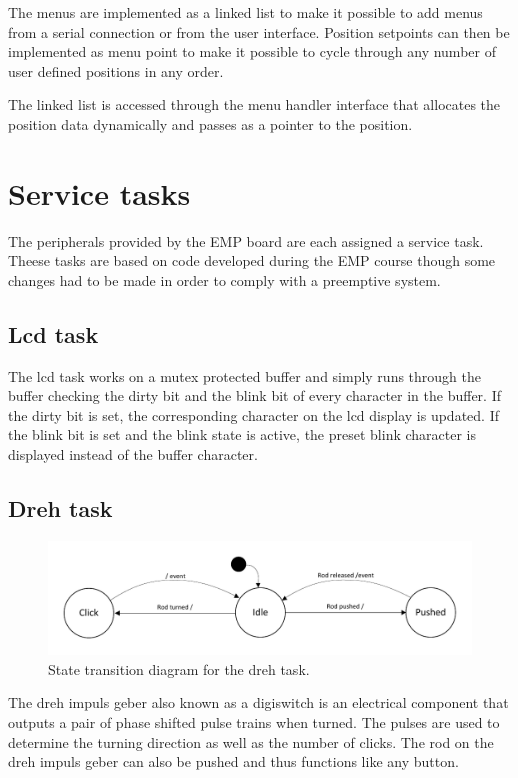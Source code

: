 The menus are implemented as a linked list to make it possible to add menus from a serial connection or from the user interface. Position setpoints can then be implemented as menu point to make it possible to cycle through any number of user defined positions in any order.

The linked list is accessed through the menu handler interface that allocates the position data dynamically and passes as a pointer to the position.

\section{Service tasks}
The peripherals provided by the EMP board are each assigned a service task. Theese tasks are based on code developed during the EMP course though some changes had to be made in order to comply with a preemptive system. 

\subsection{Lcd task}
The lcd task works on a mutex protected buffer and simply runs through the buffer checking the dirty bit and the blink bit of every character in the buffer. If the dirty bit is set, the corresponding character on the lcd display is updated. If the blink bit is set and the blink state is active, the preset blink character is displayed instead of the buffer character.

\subsection{Dreh task}
\begin{figure}[htb]
	\centering
	\includegraphics[width=\textwidth,trim=0 0 0 0]{graphics/dreh_task_fsm.pdf} 
	\caption{State transition diagram for the dreh task.}
	\label{fig:task_dreh_fsm}
\end{figure}
The dreh impuls geber also known as a digiswitch is an electrical component that outputs a pair of phase shifted pulse trains when turned. The pulses are used to determine the turning direction as well as the number of clicks. The rod on the dreh impuls geber can also be pushed and thus functions like any button.

